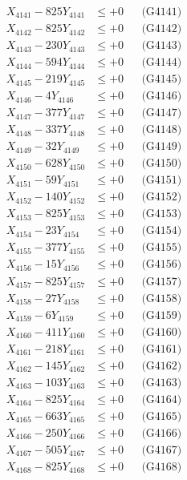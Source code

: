 \documentclass[a4paper,10pt]{article}
\begin{document}
{\begin{align}
\allowbreak
X_{4141} - 825Y_{4141} &\leq +0 && \text{(G4141)} \\
X_{4142} - 825Y_{4142} &\leq +0 && \text{(G4142)} \\
X_{4143} - 230Y_{4143} &\leq +0 && \text{(G4143)} \\
X_{4144} - 594Y_{4144} &\leq +0 && \text{(G4144)} \\
X_{4145} - 219Y_{4145} &\leq +0 && \text{(G4145)} \\
X_{4146} - 4Y_{4146} &\leq +0 && \text{(G4146)} \\
X_{4147} - 377Y_{4147} &\leq +0 && \text{(G4147)} \\
X_{4148} - 337Y_{4148} &\leq +0 && \text{(G4148)} \\
X_{4149} - 32Y_{4149} &\leq +0 && \text{(G4149)} \\
X_{4150} - 628Y_{4150} &\leq +0 && \text{(G4150)} \\
\allowbreak
X_{4151} - 59Y_{4151} &\leq +0 && \text{(G4151)} \\
X_{4152} - 140Y_{4152} &\leq +0 && \text{(G4152)} \\
X_{4153} - 825Y_{4153} &\leq +0 && \text{(G4153)} \\
X_{4154} - 23Y_{4154} &\leq +0 && \text{(G4154)} \\
X_{4155} - 377Y_{4155} &\leq +0 && \text{(G4155)} \\
X_{4156} - 15Y_{4156} &\leq +0 && \text{(G4156)} \\
X_{4157} - 825Y_{4157} &\leq +0 && \text{(G4157)} \\
X_{4158} - 27Y_{4158} &\leq +0 && \text{(G4158)} \\
X_{4159} - 6Y_{4159} &\leq +0 && \text{(G4159)} \\
X_{4160} - 411Y_{4160} &\leq +0 && \text{(G4160)} \\
\allowbreak
X_{4161} - 218Y_{4161} &\leq +0 && \text{(G4161)} \\
X_{4162} - 145Y_{4162} &\leq +0 && \text{(G4162)} \\
X_{4163} - 103Y_{4163} &\leq +0 && \text{(G4163)} \\
X_{4164} - 825Y_{4164} &\leq +0 && \text{(G4164)} \\
X_{4165} - 663Y_{4165} &\leq +0 && \text{(G4165)} \\
X_{4166} - 250Y_{4166} &\leq +0 && \text{(G4166)} \\
X_{4167} - 505Y_{4167} &\leq +0 && \text{(G4167)} \\
X_{4168} - 825Y_{4168} &\leq +0 && \text{(G4168)} \\

\end{align}}
\end{document}
